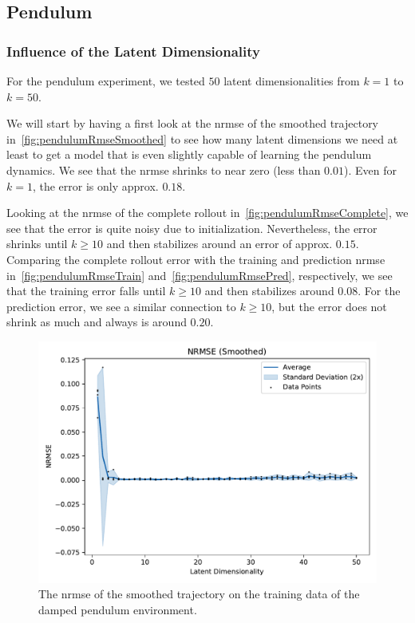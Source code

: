 	\subsection{Pendulum} %

		\subsubsection{Influence of the Latent Dimensionality}
			For the pendulum experiment, we tested \(50\) latent dimensionalities from \( k = 1 \) to \( k = 50 \).

			We will start by having a first look at the \ac{nrmse} of the smoothed trajectory in~\autoref{fig:pendulumRmseSmoothed} to see how many latent dimensions we need at least to get a model that is even slightly capable of learning the pendulum dynamics. We see that the \ac{nrmse} shrinks to near zero (less than \( 0.01 \)). Even for \( k = 1 \), the error is only approx. \( 0.18 \).

			Looking at the \ac{nrmse} of the complete rollout in~\autoref{fig:pendulumRmseComplete}, we see that the error is quite noisy due to initialization. Nevertheless, the error shrinks until \( k \geq 10 \) and then stabilizes around an error of approx. \(0.15\). Comparing the complete rollout error with the training and prediction \ac{nrmse} in~\autoref{fig:pendulumRmseTrain} and~\autoref{fig:pendulumRmsePred}, respectively, we see that the training error falls until \( k \geq 10 \) and then stabilizes around \(0.08\). For the prediction error, we see a similar connection to \( k \geq 10 \), but the error does not shrink as much and always is around \(0.20\).

			\begin{figure}
				\centering
				\includegraphics[width=0.7\linewidth]{figures/results/pendulum-damped/latent-dim/comparison-rmse-smoothed-normalized-mean-vs-latent-dim.pdf}
				\caption{The \ac{nrmse} of the smoothed trajectory on the training data of the damped pendulum environment.}
				\label{fig:pendulumRmseSmoothed}
			\end{figure}

